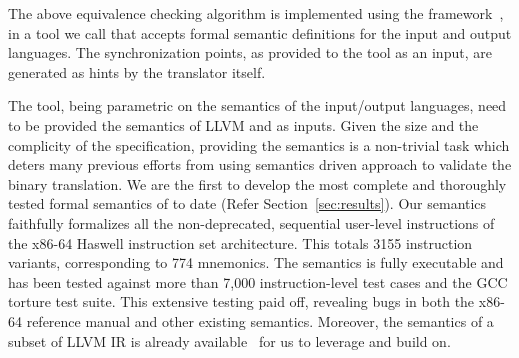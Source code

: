  The above equivalence checking algorithm is implemented using the \K
 framework~\cite{k-primer-2013-v32}, in a tool we call  that accepts
 formal semantic definitions for the input and output languages. The
 synchronization points, as provided to the tool as an input, are generated as  hints by the translator itself.
 
 The  tool, being parametric on the semantics of the input/output languages, need to be provided the semantics of LLVM and \ISA as inputs. Given the size and the complicity of the \ISA specification, providing the \ISA semantics is a non-trivial task which deters many previous efforts from using semantics driven approach to validate the binary translation. We are the first to develop 
 the most complete and thoroughly tested formal
 semantics of \ISA to date (Refer Section~\ref{sec:results}). Our semantics faithfully formalizes all the non-deprecated, sequential user-level instructions
 of the x86-64 Haswell instruction set architecture. This totals
 3155 instruction variants, corresponding to 774 mnemonics.
 The semantics is fully executable and has been tested against
 more than 7,000 instruction-level test cases and the GCC
 torture test suite. This extensive testing paid off, revealing
 bugs in both the x86-64 reference manual and other existing
 semantics.  Moreover, the semantics of a subset of
 LLVM IR is already available~\cite{LLVMSEMA} for us to leverage and build on.
%
